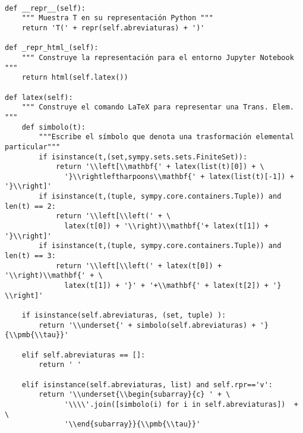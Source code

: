 \documentclass[11pt]{report}
\begin{document}
\begin{verbatim}

def __repr__(self):
    """ Muestra T en su representación Python """
    return 'T(' + repr(self.abreviaturas) + ')'

def _repr_html_(self):
    """ Construye la representación para el entorno Jupyter Notebook """
    return html(self.latex())

def latex(self):
    """ Construye el comando LaTeX para representar una Trans. Elem. """
    def simbolo(t):
        """Escribe el símbolo que denota una trasformación elemental particular"""
        if isinstance(t,(set,sympy.sets.sets.FiniteSet)):
            return '\\left[\\mathbf{' + latex(list(t)[0]) + \
              '}\\rightleftharpoons\\mathbf{' + latex(list(t)[-1]) + '}\\right]'
        if isinstance(t,(tuple, sympy.core.containers.Tuple)) and len(t) == 2:
            return '\\left[\\left(' + \
              latex(t[0]) + '\\right)\\mathbf{'+ latex(t[1]) + '}\\right]'
        if isinstance(t,(tuple, sympy.core.containers.Tuple)) and len(t) == 3:
            return '\\left[\\left(' + latex(t[0]) + '\\right)\\mathbf{' + \
              latex(t[1]) + '}' + '+\\mathbf{' + latex(t[2]) + '} \\right]'    

    if isinstance(self.abreviaturas, (set, tuple) ):
        return '\\underset{' + simbolo(self.abreviaturas) + '}{\\pmb{\\tau}}'

    elif self.abreviaturas == []:
        return ' '

    elif isinstance(self.abreviaturas, list) and self.rpr=='v':
        return '\\underset{\\begin{subarray}{c} ' + \
              '\\\\'.join([simbolo(i) for i in self.abreviaturas])  + \
              '\\end{subarray}}{\\pmb{\\tau}}'


\end{verbatim}
\end{document}
